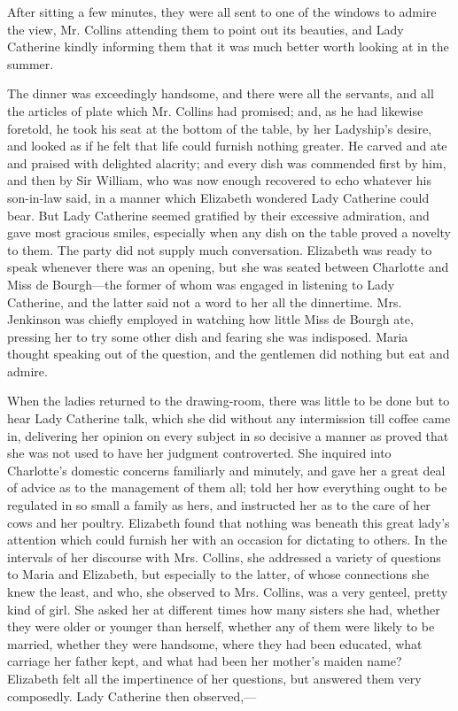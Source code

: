 \documentclass[10pt]{book}
\begin{document}
   After sitting a few minutes, they were all sent to one of the windows to
admire the view, Mr. Collins attending them to point out its beauties,
and Lady Catherine kindly informing them that it was much better worth
looking at in the summer.
  

   The dinner was exceedingly handsome, and there were all the servants,
and all the articles of plate which Mr. Collins had promised; and, as he
had likewise foretold, he took his seat at the bottom of the table, by
her Ladyship’s desire, and looked as if he felt that life could furnish
nothing greater. He carved and ate and praised with delighted alacrity;
and every dish was commended first by him, and then by Sir William, who
was now enough recovered to echo whatever his son-in-law said, in a
manner which Elizabeth wondered Lady Catherine could bear. But Lady
Catherine seemed gratified by their excessive admiration, and gave most
gracious smiles, especially when any dish on the table proved a novelty
to them. The party did not supply much conversation. Elizabeth was ready
to speak whenever there was an opening, but she was seated between
Charlotte and Miss de Bourgh—the former of whom was engaged in
listening to Lady Catherine, and the latter said not a word to her all
the dinnertime. Mrs. Jenkinson was chiefly employed in watching how
little Miss de Bourgh ate, pressing her to try some other dish and
fearing she was indisposed. Maria thought speaking out of the question,
and the gentlemen did nothing but eat and admire.
  

   When the ladies returned to the drawing-room, there was little to be
done but to hear Lady Catherine talk, which she did without any
intermission till coffee came in, delivering her opinion on every
subject in so decisive a manner as proved that she was not used to have
her judgment controverted. She inquired into Charlotte’s domestic
concerns familiarly and minutely, and gave her a great deal of advice as
to the management of them all; told her how everything ought to be
regulated in so
   small a family as hers, and instructed her as to the
care of her cows and her poultry. Elizabeth found that nothing was
beneath this great lady’s attention which could furnish her with an
occasion for dictating to others. In the intervals of her discourse with
Mrs. Collins, she addressed a variety of questions to Maria and
Elizabeth, but especially to the latter, of whose connections she knew
the least, and who, she observed to Mrs. Collins, was a very genteel,
pretty kind of girl. She asked her at different times how many sisters
she had, whether they were older or younger than herself, whether any of
them were likely to be married, whether they were handsome, where they
had been educated, what carriage her father kept, and what had been her
mother’s maiden name? Elizabeth felt all the impertinence of her
questions, but answered them very composedly. Lady Catherine then
observed,—
  
\end{document}
